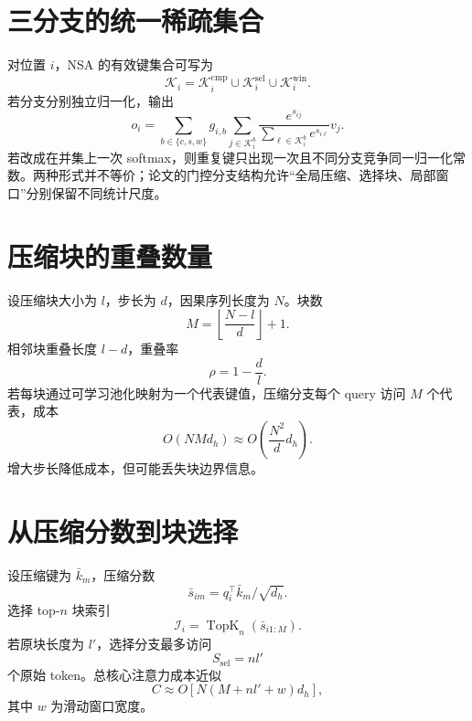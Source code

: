 \documentclass[UTF8,12pt,a4paper,fontset=none]{ctexart}
\numberwithin{equation}{section}
\begin{document}
\section{三分支的统一稀疏集合}
对位置 $i$，NSA 的有效键集合可写为
\begin{equation}
 \mathcal K_i
 =\mathcal K_i^{\mathrm{cmp}}
 \cup\mathcal K_i^{\mathrm{sel}}
 \cup\mathcal K_i^{\mathrm{win}}.
\end{equation}
若分支分别独立归一化，输出
\begin{equation}
 o_i=\sum_{b\in\{c,s,w\}}g_{i,b}
 \sum_{j\in\mathcal K_i^b}
 \frac{e^{s_{ij}}}{\sum_{\ell\in\mathcal K_i^b}e^{s_{i\ell}}}v_j.
\end{equation}
若改成在并集上一次 softmax，则重复键只出现一次且不同分支竞争同一归一化常数。两种形式并不等价；论文的门控分支结构允许“全局压缩、选择块、局部窗口”分别保留不同统计尺度。

\section{压缩块的重叠数量}
设压缩块大小为 $l$，步长为 $d$，因果序列长度为 $N$。块数
\begin{equation}
 M=\left\lfloor\frac{N-l}{d}\right\rfloor+1.
\end{equation}
相邻块重叠长度 $l-d$，重叠率
\begin{equation}
 \rho=1-\frac dl.
\end{equation}
若每块通过可学习池化映射为一个代表键值，压缩分支每个 query 访问 $M$ 个代表，成本
\begin{equation}
 O(NMd_h)\approx O\!\left(\frac{N^2}{d}d_h\right).
\end{equation}
增大步长降低成本，但可能丢失块边界信息。

\section{从压缩分数到块选择}
设压缩键为 $\bar k_m$，压缩分数
\begin{equation}
 \bar s_{im}=q_i^\top\bar k_m/\sqrt{d_h}.
\end{equation}
选择 top-$n$ 块索引
\begin{equation}
 \mathcal I_i=\operatorname{TopK}_n(\bar s_{i1:M}).
\end{equation}
若原块长度为 $l'$，选择分支最多访问
\begin{equation}
 S_{\mathrm{sel}}=nl'
\end{equation}
个原始 token。总核心注意力成本近似
\begin{equation}
 C\approx O\left[N(M+nl'+w)d_h\right],
\end{equation}
其中 $w$ 为滑动窗口宽度。
\end{document}
